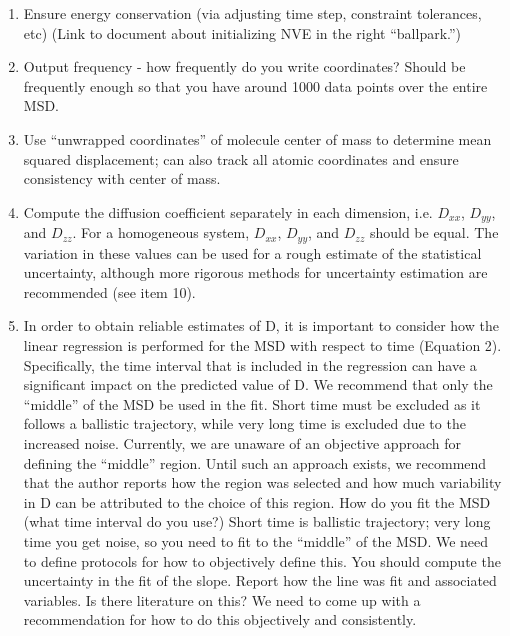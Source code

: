 \documentclass[9pt]{livecoms}
\begin{document}
\begin{enumerate}
	\item Ensure energy conservation (via adjusting time step, constraint tolerances, etc) (Link to document about initializing NVE in the right “ballpark.”) 
	\item Output frequency - how frequently do you write coordinates? Should be frequently enough so that you have around 1000 data points over the entire MSD.
	\item Use ``unwrapped coordinates'' of molecule center of mass to determine mean squared displacement; can also track all atomic coordinates and ensure consistency with center of mass.
	\item Compute the diffusion coefficient separately in each dimension, i.e. $D_{xx}$, $D_{yy}$, and $D_{zz}$. For a homogeneous system, $D_{xx}$, $D_{yy}$, and $D_{zz}$ should be equal. The variation in these values can be used for a rough estimate of the statistical uncertainty, although more rigorous methods for uncertainty estimation are recommended (see item 10).
	\item In order to obtain reliable estimates of D, it is important to consider how the linear regression is performed for the MSD with respect to time (Equation 2). Specifically, the time interval that is included in the regression can have a significant impact on the predicted value of D. We recommend that only the “middle” of the MSD be used in the fit. Short time must be excluded as it follows a ballistic trajectory, while very long time is excluded due to the increased noise. Currently, we are unaware of an objective approach for defining the “middle” region. Until such an approach exists, we recommend that the author reports how the region was selected and how much variability in D can be attributed to the choice of this region. 
	How do you fit the MSD (what time interval do you use?) Short time is ballistic trajectory; very long time you get noise, so you need to fit to the “middle” of the MSD. We need to define protocols for how to objectively define this. You should compute the uncertainty in the fit of the slope. Report how the line was fit and associated variables. Is there literature on this? We need to come up with a recommendation for how to do this objectively and consistently. 

\end{enumerate}
\end{document}
